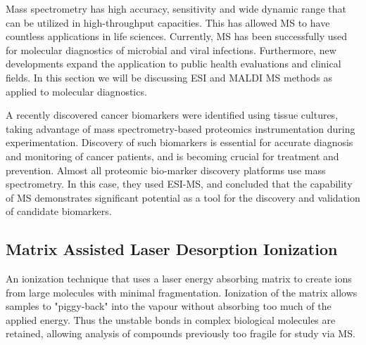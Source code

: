 \documentclass[letterpaper, 10 pt, conference]{ieeeconf}  %
\begin{document}
    Mass spectrometry has high accuracy, sensitivity and wide dynamic range that can be utilized in high-throughput capacities. This has allowed MS to have countless applications in life sciences.\autocite{R1} Currently, MS has been successfully used for molecular diagnostics of microbial and viral infections.\autocite{R7} Furthermore, new developments expand the application to public health evaluations and clinical fields. In this section we will be discussing ESI and MALDI MS methods as applied to molecular diagnostics.

    A recently discovered cancer biomarkers were identified using tissue cultures, taking advantage of mass spectrometry-based proteomics instrumentation during experimentation. Discovery of such biomarkers is essential for accurate diagnosis and monitoring of cancer patients, and is becoming crucial for treatment and prevention. Almost all proteomic bio-marker discovery platforms use mass spectrometry\autocite{R10}. In this case, they used ESI-MS, and concluded that the capability of MS demonstrates significant potential as a tool for the discovery and validation of candidate biomarkers.\autocite{R10}

        \subsection{\textbf{Matrix Assisted Laser Desorption Ionization}}
        An ionization technique that uses a laser energy absorbing matrix to create ions from large molecules with minimal fragmentation.\autocite{R5} Ionization of the matrix allows samples to "piggy-back" into the vapour without absorbing too much of the applied energy. Thus the unstable bonds in complex biological molecules are retained, allowing analysis of compounds previously too fragile for study via MS.\autocite{R5}
\end{document}
